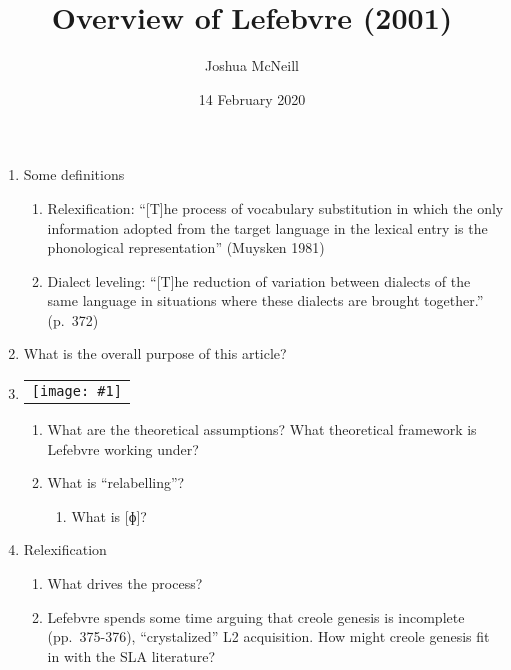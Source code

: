\documentclass{article}
\title{Overview of Lefebvre (2001)}
\author{Joshua McNeill}
\date{14 February 2020}
\newcommand{\image}[1]{
    \begin{tabular}[t]{c}
      \\
      \texttt{[image: \#1]}
    \end{tabular}
  }
\begin{document}
  \maketitle
  \begin{enumerate}
    \section{Introduction}
      \item Some definitions
      \begin{enumerate}
        \item Relexification: ``[T]he process of vocabulary substitution in which the only information adopted from the target language in the lexical entry is the phonological representation'' (Muysken 1981)
        \item Dialect leveling: ``[T]he reduction of variation between dialects of the same language in situations where these dialects are brought together.'' (p.~372)
      \end{enumerate}
      \item What is the overall purpose of this article?
      \item \image{general_model.jpg}
      \begin{enumerate}
        \item What are the theoretical assumptions? What theoretical framework is Lefebvre working under?
        \item What is ``relabelling''? %
        \begin{enumerate}
          \item What is [ɸ]? %
        \end{enumerate}
      \end{enumerate}
  \newpage
      \item Relexification
      \begin{enumerate}
        \item What drives the process? %
        \item Lefebvre spends some time arguing that creole genesis is incomplete (pp.~375-376), ``crystalized'' L2 acquisition. How might creole genesis fit in with the SLA literature?

\end{enumerate}
\end{enumerate}
\end{document}
